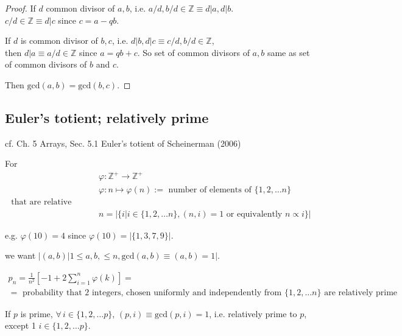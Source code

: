 \begin{proof}
If $d$ common divisor of $a,b$, i.e. $a/d, b/d \in \mathbb{Z} \equiv d|a, d|b$.   \\
$c/d \in \mathbb{Z} \equiv d|c$ since $c=a-qb$.  

If $d$ is common divisor of $b,c$, i.e. $d|b, d|c \equiv c/d, b/d\in\mathbb{Z}$, \\
then $d|a \equiv a/d \in \mathbb{Z}$ since $a=qb+c$.  So set of common divisors of $a,b$ same as set of common divisors of $b$ and $c$.  

Then $\text{gcd}(a,b) = \text{gcd}(b,c)$.  
\end{proof}




\subsection{Euler's totient; relatively prime}









cf. Ch. 5 Arrays, Sec. 5.1 Euler's totient of Scheinerman (2006) \cite{agat:Sche2006}

For 
\[
\begin{aligned}
	& \varphi : \mathbb{Z}^+ \to \mathbb{Z}^+ \\ 
	& \varphi : n \mapsto \varphi(n) := \text{ number of elements of } \lbrace 1,2, \dots n \rbrace \\
	\text{ that are relative prime to } \\
	& n = | \lbrace i | i \in \lbrace 1,2, \dots n \rbrace , (n,i)=1 \text{ or equivalently } n \propto i \rbrace |
\end{aligned}
\]

e.g. $\varphi(10) = 4$ since $\varphi(10) = | \lbrace 1,3,7,9\rbrace|$.  

we want $|(a,b) | 1 \leq a,b, \leq n , \text{gcd}(a,b) \equiv (a,b) = 1 |$.  

\[
\begin{gathered}
p_n = \frac{1}{n^2} \left[ -1 + 2\sum_{i=1}^n \varphi(k) \right] = \\
= \text{ probability that 2 integers, chosen uniformly and independently from $\lbrace 1,2,\dots n\rbrace$ are relatively prime }
\end{gathered}
\]

If $p$ is prime, $\forall \, i \in \lbrace 1,2,\dots p \rbrace$, $(p,i) \equiv \text{gcd}(p,i)=1$, i.e. relatively prime to $p$, except 1 $i\in \lbrace 1,2,\dots p\rbrace$.  

